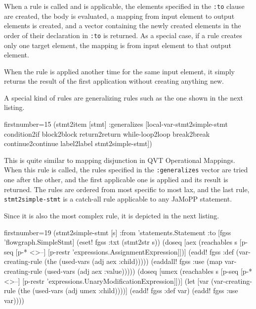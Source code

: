 \documentclass[11pt]{article}
\begin{document}
When a rule is called and is applicable, the elements specified in the
\verb|:to| clause are created, the body is evaluated, a mapping from input
element to output elements is created, and a vector containing the newly
created elements in the order of their declaration in \verb|:to| is returned.
As a special case, if a rule creates only one target element, the mapping is
from input element to that output element.

When the rule is applied another time for the same input element, it simply
returns the result of the first application without creating anything new.

A special kind of rules are generalizing rules such as the one shown in the
next listing.

\begin{clojurecode*}{firstnumber=15}
  (stmt2item [stmt]
      :generalizes [local-var-stmt2simple-stmt condition2if block2block
                    return2return while-loop2loop break2break continue2continue
                    label2label stmt2simple-stmt])
\end{clojurecode*}

This is quite similar to mapping disjunction in QVT Operational Mappings.  When
this rule is called, the rules specified in the \verb|:generalizes| vector are
tried one after the other, and the first applicable one is applied and its
result is returned.  The rules are ordered from most specific to most lax, and
the last rule, \verb|stmt2simple-stmt| is a catch-all rule applicable to any
JaMoPP statement.

Since it is also the most complex rule, it is depicted in the next listing.

\begin{clojurecode*}{firstnumber=19}
  (stmt2simple-stmt [s]
      :from 'statements.Statement
      :to [fgss 'flowgraph.SimpleStmt]
      (eset! fgss :txt (stmt2str s))
      (doseq [aex  (reachables s [p-seq [p-* <>--]
                                  [p-restr 'expressions.AssignmentExpression]])]
        (eadd! fgss :def (var-creating-rule (the (used-vars (adj aex :child)))))
        (eaddall! fgss :use (map var-creating-rule (used-vars (adj aex :value)))))
      (doseq [umex (reachables s [p-seq [p-* <>--]
                                  [p-restr 'expressions.UnaryModificationExpression]])]
        (let [var (var-creating-rule (the (used-vars (adj umex :child))))]
          (eadd! fgss :def var)
          (eadd! fgss :use var))))
\end{clojurecode*}
\end{document}
